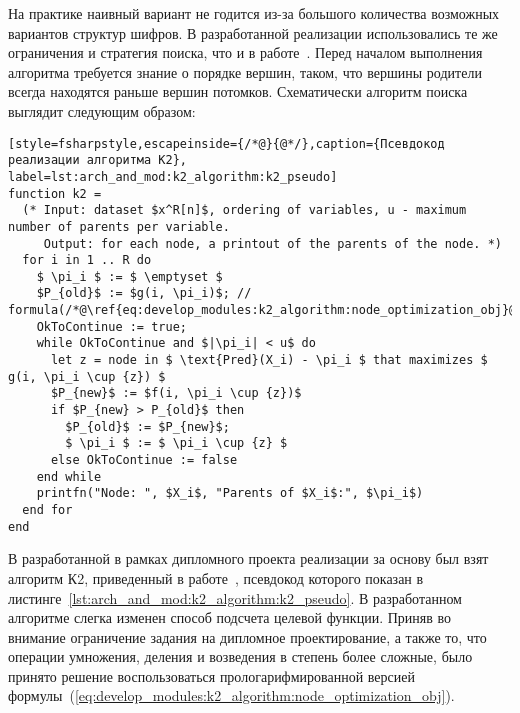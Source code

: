 На практике наивный вариант не годится из-за большого количества возможных вариантов структур шифров.
В разработанной реализации использовались те же ограничения и стратегия поиска, что и в работе~\cite{Cooper1991}.
Перед началом выполнения алгоритма требуется знание о порядке вершин, таком, что вершины родители всегда находятся раньше вершин потомков.
Схематически алгоритм поиска выглядит следующим образом:

\begin{lstlisting}[style=fsharpstyle,escapeinside={/*@}{@*/},caption={Псевдокод реализации алгоритма К2}, label=lst:arch_and_mod:k2_algorithm:k2_pseudo]
function k2 =
  (* Input: dataset $x^R[n]$, ordering of variables, u - maximum number of parents per variable.
     Output: for each node, a printout of the parents of the node. *)
  for i in 1 .. R do
    $ \pi_i $ := $ \emptyset $
    $P_{old}$ := $g(i, \pi_i)$; // formula(/*@\ref{eq:develop_modules:k2_algorithm:node_optimization_obj}@*/)
    OkToContinue := true;
    while OkToContinue and $|\pi_i| < u$ do
      let z = node in $ \text{Pred}(X_i) - \pi_i $ that maximizes $ g(i, \pi_i \cup {z}) $
      $P_{new}$ := $f(i, \pi_i \cup {z})$
      if $P_{new} > P_{old}$ then
        $P_{old}$ := $P_{new}$;
        $ \pi_i $ := $ \pi_i \cup {z} $
      else OkToContinue := false
    end while
    printfn("Node: ", $X_i$, "Parents of $X_i$:", $\pi_i$)
  end for
end
\end{lstlisting}

В разработанной в рамках дипломного проекта реализации за основу был взят алгоритм К2, приведенный в работе~\cite{Cooper1991}, псевдокод которого показан в листинге~\ref{lst:arch_and_mod:k2_algorithm:k2_pseudo}.
В разработанном алгоритме слегка изменен способ подсчета целевой функции.
Приняв во внимание ограничение задания на дипломное проектирование, а также то, что операции умножения, деления и возведения в степень более сложные, было принято решение воспользоваться прологарифмированной версией формулы~(\ref{eq:develop_modules:k2_algorithm:node_optimization_obj}).

